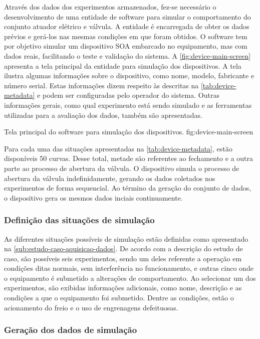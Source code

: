 Através dos dados dos experimentos armazenados, fez-se necessário o desenvolvimento de uma entidade
de software para simular o comportamento do conjunto atuador elétrico e válvula. A entidade é
encarregada de obter os dados prévios e gerá-los nas mesmas condições em que foram obtidos. O
software tem por objetivo simular um dispositivo \gls{SOA} embarcado no equipamento, mas com dados
reais, facilitando o teste e validação do sistema. A \cref{fig:device-main-screen} apresenta a tela
principal da entidade para simulação dos dispositivos. A tela ilustra algumas informações sobre o
dispositivo, como nome, modelo, fabricante e número serial. Estas informações dizem respeito às
descritas na \cref{tab:device-metadata} e podem ser configuradas pelo operador do sistema. Outras
informações gerais, como qual experimento está sendo simulado e as ferramentas utilizadas para a
avaliação dos dados, também são apresentadas.

  {Tela principal do software para simulação dos dispositivos.}
  {fig:device-main-screen}

Para cada uma das situações apresentadas na \cref{tab:device-metadata}, estão disponíveis \num{50}
curvas. Desse total, metade são referentes ao fechamento e a outra parte ao processo de abertura da
válvula. O dispositivo simula o processo de abertura da válvula indefinidamente, gerando os dados
coletados nos experimentos de forma sequencial. Ao término da geração do conjunto de dados, o
dispositivo gera os mesmos dados inciais continuamente.


\subsubsection{Definição das situações de simulação}

As diferentes situações possíveis de simulação estão definidas como apresentado na
\cref{sub:estudo-caso-aquisicao-dados}. De acordo com a descrição do estudo de caso, são possíveis
seis experimentos, sendo um deles referente a operação em condições ditas normais, sem interferência
no funcionamento, e outras cinco onde o equipamento é submetido a alterações de comportamento. Ao
selecionar um dos experimentos, são exibidas informações adicionais, como nome, descrição e as
condições a que o equipamento foi submetido. Dentre as condições, estão o acionamento do freio e o
uso de engrenagens defeituosas.


\subsubsection{Geração dos dados de simulação}

